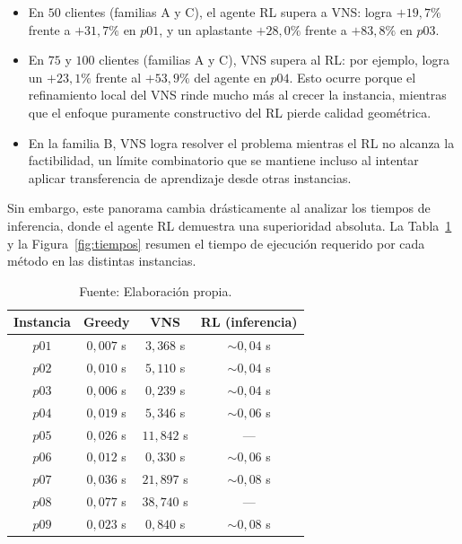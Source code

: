 \begin{itemize}
    \item En $50$ clientes (familias A y C), el agente RL supera a VNS: logra $+19{,}7\%$ frente a $+31{,}7\%$ en $p01$, y un aplastante $+28{,}0\%$ frente a $+83{,}8\%$ en $p03$.

    \item En $75$ y $100$ clientes (familias A y C), VNS supera al RL: por ejemplo, logra un $+23{,}1\%$ frente al $+53{,}9\%$ del agente en $p04$. Esto ocurre porque el refinamiento local del VNS rinde mucho más al crecer la instancia, mientras que el enfoque puramente constructivo del RL pierde calidad geométrica.

    \item En la familia B, VNS logra resolver el problema mientras el RL no alcanza la factibilidad, un límite combinatorio que se mantiene incluso al intentar aplicar transferencia de aprendizaje desde otras instancias.
\end{itemize}

Sin embargo, este panorama cambia drásticamente al analizar los tiempos de inferencia, donde el agente RL demuestra una superioridad absoluta. La Tabla~\ref{tab:tiempos} y la Figura~\ref{fig:tiempos} resumen el tiempo de ejecución requerido por cada método en las distintas instancias.

\begin{table}[H]
    \centering
    \caption{\label{tab:tiempos} Tiempos de inferencia/ejecución de los tres métodos por instancia.}
    \caption*{Fuente: Elaboración propia.}
    \renewcommand{\arraystretch}{1.15}
    \setlength{\tabcolsep}{10pt}
    \begin{tabular}{@{}cccc@{}}
        \toprule
        \textbf{Instancia} & \textbf{Greedy} & \textbf{VNS} & \textbf{RL (inferencia)} \\
        \midrule
        $p01$ & $0{,}007$ s & $3{,}368$ s & $\sim 0{,}04$ s \\
        $p02$ & $0{,}010$ s & $5{,}110$ s & $\sim 0{,}04$ s \\
        $p03$ & $0{,}006$ s & $0{,}239$ s & $\sim 0{,}04$ s \\
        $p04$ & $0{,}019$ s & $5{,}346$ s & $\sim 0{,}06$ s \\
        $p05$ & $0{,}026$ s & $11{,}842$ s & --- \\
        $p06$ & $0{,}012$ s & $0{,}330$ s & $\sim 0{,}06$ s \\
        $p07$ & $0{,}036$ s & $21{,}897$ s & $\sim 0{,}08$ s \\
        $p08$ & $0{,}077$ s & $38{,}740$ s & --- \\
        $p09$ & $0{,}023$ s & $0{,}840$ s & $\sim 0{,}08$ s \\
        \bottomrule
    \end{tabular}
\end{table}

